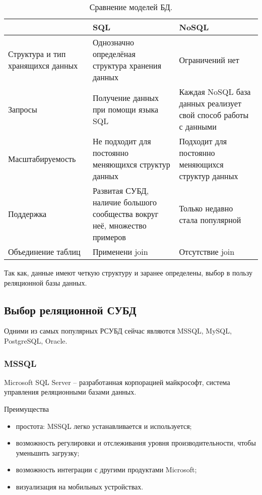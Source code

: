 \begin{table}[H]
\caption{Сравнение моделей БД. }
\begin{tabular}{|p{5cm}|p{5cm}|p{5cm}|}
\hline
 & SQL & NoSQL  \\ \hline
Структура и тип хранящихся данных & Однозначно определёная структура хранения данных & Ограничений нет \\ \hline
Запросы & Получение данных при помощи языка SQL&  Каждая NoSQL база данных реализует свой способ работы с данными \\ \hline
Масштабируемость  & Не подходит для постоянно меняющихся структур данных & Подходит для постоянно меняющихся структур данных \\ \hline
Поддержка & Развитая СУБД, наличие большого сообщества вокруг неё, множество примеров & Только недавно стала популярной \\ \hline
Объединение таблиц & Применени join & Отсутствие join \\ \hline
\end{tabular}
\label{table:subd}
\end{table}

Так как, данные имеют четкую структуру и заранее определены, выбор в пользу реляционной базы данных. 

\subsection{\textbf{Выбор реляционной СУБД}}

Одними из самых популярных РСУБД сейчас являются MSSQL, MySQL, PostgreSQL, Oracle.

\subsubsection{\textbf{MSSQL}}

Microsoft SQL Server -- разработанная корпорацией майкрософт, система управления реляционными базами данных.

Преимущества
\begin{itemize}
\item простота: MSSQL легко устанавливается и используется;
\item возможность регулировки и отслеживания уровня производительности, чтобы уменьшить загрузку;
\item возможность интеграции с другими продуктами Microsoft;
\item визуализация на мобильных устройствах.
\end{itemize}

